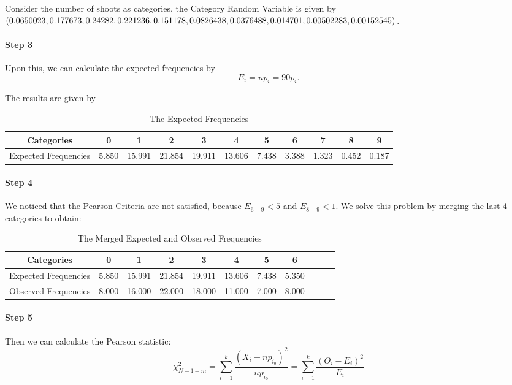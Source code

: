 \documentclass[a4paper]{article}
\begin{document}
Consider the number of shoots as categories, the Category Random Variable is given by $(0.0650023, 0.177673,\\ 0.24282, 0.221236, 0.151178, 0.0826438, 0.0376488, 0.014701, 0.00502283, 0.00152545)$. 

\paragraph{Step 3} Upon this, we can calculate the expected frequencies by 
$$E_i=np_i=90p_i.$$

\newpage

The results are given by

\begin{table}[!htbp]
  \centering
    \begin{tabular}{ccccccccccc}
    \hline
    Categories & 0     & 1     & 2     & 3     & 4     & 5     & 6     & 7     & 8     & 9 \\
    \hline
    Expected Frequencies & 5.850  & 15.991  & 21.854  & 19.911  & 13.606  & 7.438  & 3.388  & 1.323  & 0.452  & 0.187  \\
    \hline
    \end{tabular}%
    \caption{The Expected Frequencies}
\end{table}%

\paragraph{Step 4} We noticed that the Pearson Criteria are not satisfied, because $E_{6-9}<5$ and $E_{8-9}<1$. We solve this problem by merging the last 4 categories to obtain:

\begin{table}[!htbp]
  \centering
    \begin{tabular}{ccccccccccc}
    \hline
    Categories & 0     & 1     & 2     & 3     & 4     & 5     & 6 \\
    \hline
    Expected Frequencies & 5.850  & 15.991  & 21.854  & 19.911  & 13.606  & 7.438  & 5.350  \\
    Observed Frequencies & 8.000  & 16.000  & 22.000  & 18.000  & 11.000  & 7.000  & 8.000  \\
    \hline
    \end{tabular}%
    \caption{The Merged Expected and Observed Frequencies}
\end{table}%

\paragraph{Step 5}
Then we can calculate the Pearson statistic:
$$\chi_{N-1-m}^2 = \sum^k_{i=1}\frac{(X_i-np_{i_0})^2}{np_{i_0}}=\sum^k_{i=1}\frac{(O_i-E_i)^2}{E_i}$$
\end{document}
